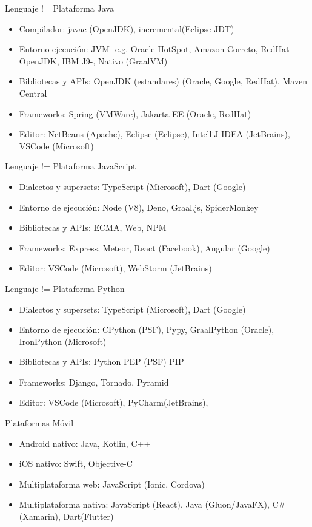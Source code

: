 \documentclass[aspectratio=169]{beamer}
\begin{document}
\begin{frame}{Lenguaje != Plataforma}
    Java
	\begin{itemize}
	\item Compilador: javac (OpenJDK), incremental(Eclipse JDT)
    \item Entorno ejecución: JVM -e.g. Oracle HotSpot, Amazon Correto, RedHat OpenJDK, IBM J9-, Nativo (GraalVM)
    \item Bibliotecas y APIs: OpenJDK (estandares) (Oracle, Google, RedHat), Maven Central
    \item Frameworks: Spring (VMWare), Jakarta EE (Oracle, RedHat)
    \item Editor: NetBeans (Apache), Eclipse (Eclipse), IntelliJ IDEA (JetBrains), VSCode (Microsoft)
	\end{itemize}
\end{frame}


\begin{frame}{Lenguaje != Plataforma}
    JavaScript
	\begin{itemize}
	\item Dialectos y supersets: TypeScript (Microsoft), Dart (Google)
    \item Entorno de ejecución: Node (V8), Deno, Graal.js, SpiderMonkey
    \item Bibliotecas y APIs: ECMA, Web, NPM
    \item Frameworks: Express, Meteor, React (Facebook), Angular (Google)
    \item Editor: VSCode (Microsoft), WebStorm (JetBrains)
	\end{itemize}
\end{frame}


\begin{frame}{Lenguaje != Plataforma}
    Python
	\begin{itemize}
	\item Dialectos y supersets: TypeScript (Microsoft), Dart (Google)
    \item Entorno de ejecución: CPython (PSF), Pypy, GraalPython (Oracle), IronPython (Microsoft)
    \item Bibliotecas y APIs: Python PEP (PSF) PIP
    \item Frameworks: Django, Tornado, Pyramid
    \item Editor: VSCode (Microsoft), PyCharm(JetBrains),
	\end{itemize}
\end{frame}

\begin{frame}{Plataformas}
    Móvil
	\begin{itemize}
	\item Android nativo: Java, Kotlin, C++
    \item iOS nativo: Swift, Objective-C
    \item Multiplataforma web: JavaScript (Ionic, Cordova)
    \item Multiplataforma nativa: JavaScript (React), Java (Gluon/JavaFX), C\# (Xamarin), Dart(Flutter)
	\end{itemize}
\end{frame}
\end{document}
